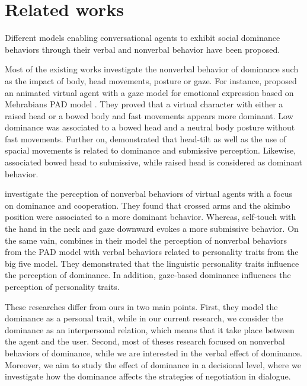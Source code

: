 \documentclass{llncs}
\begin{document}
	\section{Related works}
	Different models enabling conversational agents to exhibit social dominance behaviors through their verbal and nonverbal behavior have been proposed. 
	
	Most of the existing works investigate the nonverbal behavior of dominance such as the impact of body, head movements, posture or gaze. For instance, \cite{lance2008relation}  proposed an animated virtual agent with a gaze model for emotional expression based on Mehrabians PAD model \cite{mehrabian1996analysis}. They proved that a virtual character with either a raised head or a bowed body and fast movements appears more dominant. Low dominance was associated to a bowed head and a neutral body posture without fast movements.	Further on,	 \cite{gebhard2014exploring,callejas2014computational} demonstrated that head-tilt as well as the use of spacial movements is related to dominance and submissive perception. Likewise, \cite{mignault2003many} associated bowed head to submissive, while raised head is considered as dominant behavior.
	
	\par \cite{strassmann2016effect} investigate the perception of nonverbal behaviors of virtual agents with a focus on dominance and cooperation. They found that crossed arms and the akimbo position were associated to a more dominant behavior. Whereas, self-touch with the hand in the neck and gaze downward evokes a more submissive behavior. On the same vain,  \cite{bee2010bossy} combines in their model the perception of nonverbal behaviors from the PAD model \cite{mehrabian1996analysis} with verbal behaviors related to personality traits from the big five model. They demonstrated that the linguistic personality traits influence the perception of dominance. In addition, gaze-based dominance influences the perception of personality traits.
	
	These researches differ from ours in two main points. First, they model the dominance as a personal trait, while in our current research, we consider the dominance as an interpersonal relation, which means that it take place between the agent and the user. Second, most of theses research focused on nonverbal behaviors of dominance, while we are interested in the verbal effect of dominance. Moreover, we aim to study the effect of dominance in a decisional level, where we investigate how the dominance affects the strategies of negotiation in dialogue.
	
\end{document}
